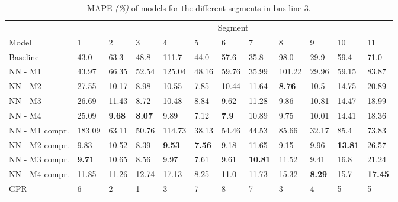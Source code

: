 \begin{table}[H]
  \centering
  \caption{MAPE \textit{(\%)} of models for the different segments in bus line 3.}
  \label{fig:model-mape-of-segs-203}
  \begin{adjustbox}{center}
		\begin{tabular}{l|l|l|l|l|l|l|l|l|l|l|l}
					   & \multicolumn{11}{c}{Segment}                                                                                                                                                      \\
		Model          & 1             & 2             & 3             & 4             & 5             & 6            & 7              & 8             & 9             & 10             & 11               \\ 
		\hline
		Baseline       & 43.0          & 63.3          & 48.8          & 111.7         & 44.0          & 57.6         & 35.8           & 98.0          & 29.9          & 59.4           & 71.0             \\
		NN - M1        & 43.97         & 66.35         & 52.54         & 125.04        & 48.16         & 59.76        & 35.99          & 101.22        & 29.96         & 59.15          & 83.87            \\
		NN - M2        & 27.55         & 10.17         & 8.98          & 10.55         & 7.85          & 10.44        & 11.64          & \textbf{8.76} & 10.5          & 14.75          & 20.89            \\
		NN - M3        & 26.69         & 11.43         & 8.72          & 10.48         & 8.84          & 9.62         & 11.28          & 9.86          & 10.81         & 14.47          & 18.99            \\
		NN - M4        & 25.09         & \textbf{9.68} & \textbf{8.07} & 9.89          & 7.12          & \textbf{7.9} & 10.89          & 9.75          & 10.01         & 14.41          & 18.36            \\
		NN - M1 compr. & 183.09        & 63.11         & 50.76         & 114.73        & 38.13         & 54.46        & 44.53          & 85.66         & 32.17         & 85.4           & 73.83            \\
		NN - M2 compr. & 9.83          & 10.52         & 8.39          & \textbf{9.53} & \textbf{7.56} & 9.18         & 11.65          & 9.15          & 9.96          & \textbf{13.81} & 26.57            \\
		NN - M3 compr. & \textbf{9.71} & 10.65         & 8.56          & 9.97          & 7.61          & 9.61         & \textbf{10.81} & 11.52         & 9.41          & 16.8           & 21.24            \\
		NN - M4 compr. & 11.85         & 11.26         & 12.74         & 17.13         & 8.25          & 11.0         & 11.73          & 15.32         & \textbf{8.29} & 15.7           & \textbf{17.45 }  \\
		GPR            & 6             & 2             & 1             & 3             & 7             & 8            & 7              & 3             & 4             & 5              & 5               
		\end{tabular}
\end{adjustbox}
\end{table}

